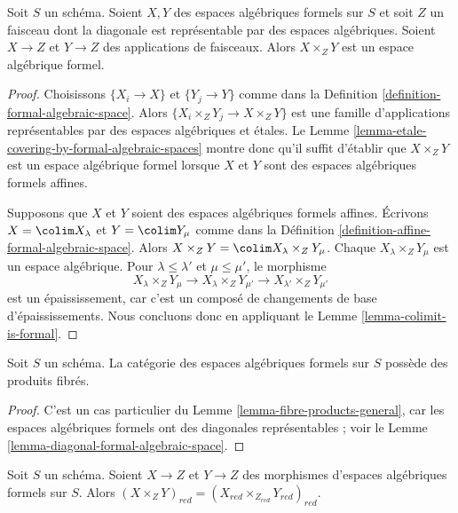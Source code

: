 \begin{lemma}
\label{lemma-fibre-products-general}
Soit $S$ un schéma. Soient $X, Y$ des espaces algébriques formels sur $S$
et soit $Z$ un faisceau dont la diagonale est représentable par des
espaces algébriques. Soient $X \to Z$ et $Y \to Z$ des applications de faisceaux.
Alors $X \times_Z Y$ est un espace algébrique formel.
\end{lemma}

\begin{proof}
Choisissons $\{X_i \to X\}$ et $\{Y_j \to Y\}$ comme dans la
Definition \ref{definition-formal-algebraic-space}.
Alors $\{X_i \times_Z Y_j \to X \times_Z Y\}$ est une famille
d'applications représentables par des espaces algébriques et étales.
Le Lemme \ref{lemma-etale-covering-by-formal-algebraic-spaces}
montre donc qu'il suffit d'établir que $X \times_Z Y$ est un espace algébrique
formel lorsque $X$ et $Y$ sont des espaces algébriques formels affines.

\medskip\noindent
Supposons que $X$ et $Y$ soient des espaces algébriques formels affines.
Écrivons $X = \colim X_\lambda$ et $Y = \colim Y_\mu$ comme
dans la Définition \ref{definition-affine-formal-algebraic-space}.
Alors $X \times_Z Y = \colim X_\lambda \times_Z Y_\mu$.
Chaque $X_\lambda \times_Z Y_\mu$ est un espace algébrique.
Pour $\lambda \leq \lambda'$ et $\mu \leq \mu'$, le morphisme
$$
X_\lambda \times_Z Y_\mu \to
X_\lambda \times_Z Y_{\mu'} \to
X_{\lambda'} \times_Z Y_{\mu'}
$$
est un épaississement, car c'est un composé de changements de base d'épaississements.
Nous concluons donc en appliquant le Lemme \ref{lemma-colimit-is-formal}.
\end{proof}

\begin{lemma}
\label{lemma-fibre-products}
Soit $S$ un schéma. La catégorie des espaces algébriques formels sur $S$
possède des produits fibrés.
\end{lemma}

\begin{proof}
C'est un cas particulier du Lemme \ref{lemma-fibre-products-general},
car les espaces algébriques formels ont des diagonales représentables ; voir le
Lemme \ref{lemma-diagonal-formal-algebraic-space}.
\end{proof}

\begin{lemma}
\label{lemma-reduction-fibre-products}
Soit $S$ un schéma. Soient $X \to Z$ et $Y \to Z$ des morphismes
d'espaces algébriques formels sur $S$. Alors
$(X \times_Z Y)_{red} = (X_{red} \times_{Z_{red}} Y_{red})_{red}$.
\end{lemma}

